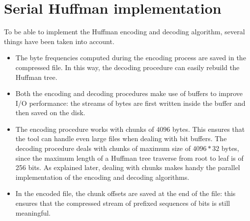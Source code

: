 \section{Serial Huffman implementation}
To be able to implement the Huffman encoding and decoding algorithm, several things have been taken into account.
\begin{itemize}
    \item The byte frequencies computed during the encoding process are saved in the compressed file. In this way, the decoding procedure can easily rebuild the Huffman tree.
    \item Both the encoding and decoding procedures make use of buffers to improve I/O performance: the streams of bytes are first written inside the buffer and then saved on the disk.
    \item The encoding procedure works with chunks of \(4096\) bytes. This ensures that the tool can handle even large files when dealing with bit buffers. The decoding procedure deals with chunks of maximum size of \(4096*32\) bytes, since the maximum length of a Huffman tree traverse from root to leaf is of 256 bits. As explained later, dealing with chunks makes handy the parallel implementation of the encoding and decoding algorithms.
    \item In the encoded file, the chunk offsets are saved at the end of the file: this ensures that the compressed stream of prefixed sequences of bits is still meaningful.
\end{itemize}
